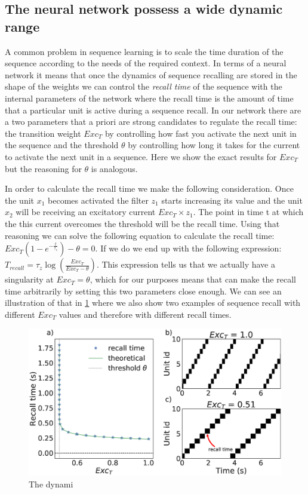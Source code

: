 \documentclass{esannV2}
\begin{document}
\subsection{The neural network possess a wide dynamic range}

A common problem in sequence learning is to scale the time duration of the sequence according to the needs of the required context. In terms of a neural network it means that once the dynamics of sequence recalling are stored in the shape of the weights we can control the \textit{recall time} of the sequence with the internal parameters of the network where the recall time is the amount of time that a particular unit is active during a sequence recall. In our network there are a two parameters that a priori are strong candidates to regulate the recall time: the transition weight $Exc_T$ by controlling how fast you activate the next unit in the sequence and the threshold $\theta$ by controlling how long it takes for the current to activate the next unit in a sequence. Here we show the exact results for $Exc_T$ but the reasoning for $\theta$ is analogous.  

In order to calculate the recall time we make the following consideration. Once the unit $x_1$ becomes activated the filter $z_1$ starts increasing its value and the unit $x_2$ will be receiving an excitatory current $Exc_T \times z_1$. The point in time t at which the this current overcomes the threshold will be the recall time. Using that reasoning we can solve the following equation to calculate the recall time: $Exc_{T}(1 - e^{-\frac{t}{\tau_z}}) - \theta = 0$. If we do we end up with the following expression: $T_{recall} = \tau_z \log(\frac{Exc_T}{Exc_T - \theta})$. This expression tells us that we actually have a singularity at $Exc_T = \theta$, which for our purposes means that can make the recall time arbitrarily by setting this two parameters close enough. We can see an illustration of that in \ref{Fig:dynamical_range} where we also show two examples of sequence recall with different $Exc_T$ values and therefore with different recall times. 



\begin{figure}[h!]
\centering
\includegraphics[scale=0.25]{dynamical_range.eps}
\caption{The dynami}\label{Fig:dynamical_range}
\end{figure}
\end{document}
